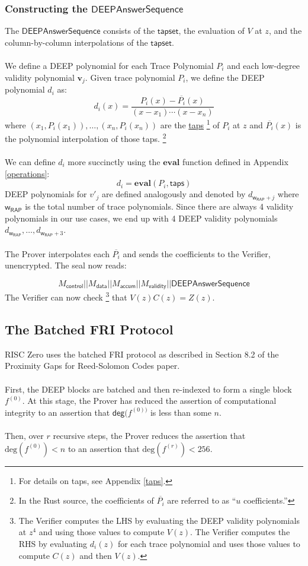 \documentclass[10pt,letterpaper,titlepage]{article}
\theoremstyle{definition}
\begin{document}
\begin{appendices}
\subsubsection{Constructing the $\mathsf{DEEPAnswerSequence}$}
The $\mathsf{DEEPAnswerSequence}$ consists of the $\mathsf{tapset}$, the evaluation of $V$ at $z$, and the column-by-column interpolations of the $\mathsf{tapset}$.\\
\label{DEEP Polynomials}
\\
We define a DEEP polynomial for each Trace Polynomial $P_i$ and each low-degree validity polynomial $\mathbf{v}_j$. Given trace polynomial $P_i$, we define the DEEP polynomial $d_i$ as: 
\[d_i(x)=\frac{P_i(x)-\overline{P_i}(x)}{(x-x_1)\cdots(x-x_n)}\]
where $(x_1,P_i(x_1)),\ldots,(x_n,P_i(x_n))$ are the \hyperref[taps]{taps}%
\footnote{For details on taps, see Appendix \ref*{taps}.} 
of $P_i$ at $z$ and $\overline{P_i}(x)$ is the polynomial interpolation of those taps.%
\footnote{In the Rust source, the coefficients of $\overline{P_i}$ are referred to as ``$u$ coefficients.'' }
\\
\\
We can define $d_i$ more succinctly using the $\textbf{eval}$ function defined in Appendix \ref{operations}:
\[
  d_i=
  \mathbf{eval}(
    P_i,
    \mathsf{taps}
  )\]
DEEP polynomials for $v'_j$ are defined analogously and denoted by $d_{\mathsf{w}_\mathsf{RAP}+j}$ where $\mathsf{w}_\mathsf{RAP}$ is the total number of trace polynomials. 
Since there are always 4 validity polynomials in our use cases, we end up with 4 DEEP validity polynomials $d_{\mathsf{w}_\mathsf{RAP}},\ldots,d_{\mathsf{w}_\mathsf{RAP}+3}$. \\
\\
The Prover interpolates each $\overline{P_i}$ and sends the coefficients to the Verifier, unencrypted. The seal now reads: 

\[
  M_\mathsf{control}||
  M_\mathsf{data}||
  M_\mathsf{accum}||
  M_\mathsf{validity}||
  \mathsf{DEEPAnswerSequence}
\]
The Verifier can now check%
\footnote{
  The Verifier computes the LHS by evaluating the DEEP validity polynomials at $z^4$ and using those values to compute $V(z)$. 
  The Verifier computes the RHS by evaluating $d_i(z)$ for each trace polynomial and uses those values to compute $C(z)$ and then $V(z)$.
  }
that $V(z)C(z)=Z(z)$. 
\subsection{The Batched FRI Protocol}
\label{FRI}
RISC Zero uses the batched FRI protocol as described in Section 8.2 of the Proximity Gaps for Reed-Solomon Codes paper. \\
\\
First, the DEEP blocks are batched and then re-indexed to form a single block $f^{(0)}$. 
At this stage, the Prover has reduced the assertion of computational integrity to an assertion that $\mathsf{deg}(f^{(0))}$ is less than some $n$. \\
\\
Then, over $r$ recursive steps, the Prover reduces the assertion that $\text{deg}(f^{(0)})<n$ to an assertion that $\text{deg}(f^{(r)})<256$. 

\end{appendices}
\end{document}
